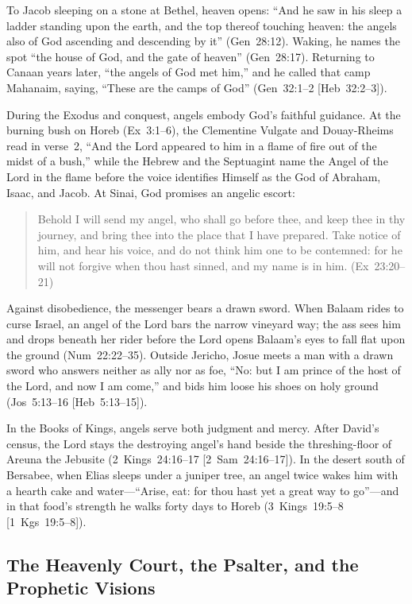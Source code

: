 To Jacob sleeping on a stone at Bethel, heaven opens: ``And he saw in his sleep a ladder standing upon the earth, and the top thereof touching heaven: the angels also of God ascending and descending by it'' (Gen~28:12). Waking, he names the spot ``the house of God, and the gate of heaven'' (Gen~28:17). Returning to Canaan years later, ``the angels of God met him,'' and he called that camp Mahanaim, saying, ``These are the camps of God'' (Gen~32:1--2 [Heb~32:2--3]).

During the Exodus and conquest, angels embody God's faithful guidance. At the burning bush on Horeb (Ex~3:1--6), the Clementine Vulgate and Douay-Rheims read in verse~2, ``And the Lord appeared to him in a flame of fire out of the midst of a bush,'' while the Hebrew and the Septuagint name the Angel of the Lord in the flame before the voice identifies Himself as the God of Abraham, Isaac, and Jacob. At Sinai, God promises an angelic escort:
\begin{quotation}
Behold I will send my angel, who shall go before thee, and keep thee in thy journey, and bring thee into the place that I have prepared. Take notice of him, and hear his voice, and do not think him one to be contemned: for he will not forgive when thou hast sinned, and my name is in him. (Ex~23:20--21)
\end{quotation}
Against disobedience, the messenger bears a drawn sword. When Balaam rides to curse Israel, an angel of the Lord bars the narrow vineyard way; the ass sees him and drops beneath her rider before the Lord opens Balaam's eyes to fall flat upon the ground (Num~22:22--35). Outside Jericho, Josue meets a man with a drawn sword who answers neither as ally nor as foe, ``No: but I am prince of the host of the Lord, and now I am come,'' and bids him loose his shoes on holy ground (Jos~5:13--16 [Heb~5:13--15]).

In the Books of Kings, angels serve both judgment and mercy. After David's census, the Lord stays the destroying angel's hand beside the threshing-floor of Areuna the Jebusite (2~Kings~24:16--17 [2~Sam~24:16--17]). In the desert south of Bersabee, when Elias sleeps under a juniper tree, an angel twice wakes him with a hearth cake and water---``Arise, eat: for thou hast yet a great way to go''---and in that food's strength he walks forty days to Horeb (3~Kings~19:5--8 [1~Kgs~19:5--8]).

\subsection{The Heavenly Court, the Psalter, and the Prophetic Visions}
\label{subsec:ot-court-prophets}

